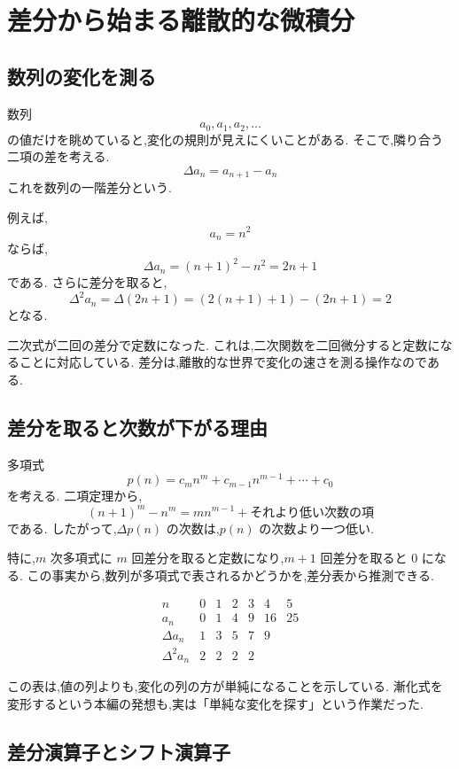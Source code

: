 
\section{差分から始まる離散的な微積分}\label{節：差分から始まる離散的な微積分}

\subsection{数列の変化を測る}

数列
\[
  a_0,a_1,a_2,\ldots
\]
の値だけを眺めていると,変化の規則が見えにくいことがある.
そこで,隣り合う二項の差を考える.
\[
  \Delta a_n=a_{n+1}-a_n
\]
これを数列の一階差分という.

例えば,
\[
  a_n=n^2
\]
ならば,
\[
  \Delta a_n=(n+1)^2-n^2=2n+1
\]
である.
さらに差分を取ると,
\[
  \Delta^2a_n
  =\Delta(2n+1)
  =(2(n+1)+1)-(2n+1)=2
\]
となる.

二次式が二回の差分で定数になった.
これは,二次関数を二回微分すると定数になることに対応している.
差分は,離散的な世界で変化の速さを測る操作なのである.

\subsection{差分を取ると次数が下がる理由}

多項式
\[
  p(n)=c_mn^m+c_{m-1}n^{m-1}+\cdots+c_0
\]
を考える.
二項定理から,
\[
  (n+1)^m-n^m
  =mn^{m-1}+\text{それより低い次数の項}
\]
である.
したがって,$\Delta p(n)$ の次数は,$p(n)$ の次数より一つ低い.

特に,$m$ 次多項式に $m$ 回差分を取ると定数になり,$m+1$ 回差分を取ると $0$ になる.
この事実から,数列が多項式で表されるかどうかを,差分表から推測できる.

\[
  \begin{array}{c|cccccc}
    n           & 0 & 1 & 2 & 3 & 4  & 5  \\ \hline
    a_n         & 0 & 1 & 4 & 9 & 16 & 25 \\
    \Delta a_n  & 1 & 3 & 5 & 7 & 9  &    \\
    \Delta^2a_n & 2 & 2 & 2 & 2 &    &
  \end{array}
\]

この表は,値の列よりも,変化の列の方が単純になることを示している.
漸化式を変形するという本編の発想も,実は「単純な変化を探す」という作業だった.

\subsection{差分演算子とシフト演算子}

